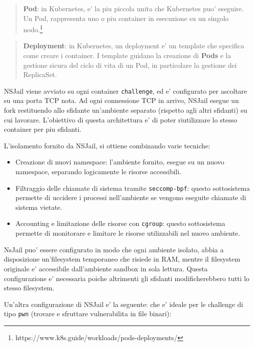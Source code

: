 \begin{quote}
\textbf{Pod}: in Kubernetes, e' la piu piccola unita che Kubernetes puo'
eseguire. Un Pod, rappresenta uno o piu container in esecuzione su un
singolo nodo.\footnote{\label{fn:ref_5}https://www.k8s.guide/workloads/pods-deployments/}
\end{quote}

\begin{quote}
\textbf{Deployment}: in Kubernetes, un deployment e' un template che
specifica come creare i container. I template guidano la creazione di
\textbf{Pods} e la gestione sicura del ciclo di vita di un Pod, in
particolare la gestione dei ReplicaSet.
\end{quote}

NSJail viene avviato su ogni container
\passthrough{\lstinline!challenge!}, ed e' configurato per ascoltare su
una porta TCP nota. Ad ogni connessione TCP in arrivo, NSJail esegue un
fork restituendo allo sfidante un'ambiente separato (rispetto agli altri
sfidanti) su cui lavorare. L'obiettivo di questa architettura e' di
poter riutilizzare lo stesso container per piu sfidanti.

L'isolamento fornito da NSJail, si ottiene combinando varie tecniche:

\begin{itemize}
\tightlist
\item
  Creazione di nuovi namespace: l'ambiente fornito, esegue su un nuovo
  namespace, separando logicamente le risorse accessibili.
\item
  Filtraggio delle chiamate di sistema tramite
  \passthrough{\lstinline!seccomp-bpf!}: questo sottosistema permette di
  uccidere i processi nell'ambiente se vengono eseguite chiamate di
  sistema vietate.
\item
  Accounting e limitazione delle risorse con
  \passthrough{\lstinline!cgroup!}: questo sottosistema permette di
  monitorare e limitare le risorse utilizzabili nel nuovo ambiente.
\end{itemize}

NsJail puo' essere configurato in modo che ogni ambiente isolato, abbia
a disposizione un'filesystem temporaneo che risiede in RAM, mentre il
filesystem originale e' accessibile dall'ambiente sandbox in sola
lettura. Questa configurazione e' necessaria poiche altrimenti gli
sfidanti modificherebbero tutti lo stesso filesystem.

Un'altra configurazione di NSJail e' la seguente: che e' ideale per le
challenge di tipo \passthrough{\lstinline!pwn!} (trovare e sfruttare
vulnerabilita in file binari):


